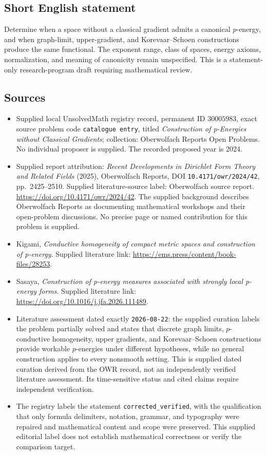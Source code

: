 \documentclass[11pt]{article}
\begin{document}
\subsection{Short English statement}
Determine when a space without a classical gradient admits a canonical \(p\)-energy, and when graph-limit, upper-gradient, and Korevaar--Schoen constructions produce the same functional. The exponent range, class of spaces, energy axioms, normalization, and meaning of canonicity remain unspecified. This is a statement-only research-program draft requiring mathematical review.
\subsection{Sources}
\begin{itemize}
\item Supplied local UnsolvedMath registry record, permanent ID \(30005983\), exact source problem code \texttt{catalogue entry}, titled \emph{Construction of p-Energies without Classical Gradients}; collection: Oberwolfach Reports Open Problems. No individual proposer is supplied. The recorded proposed year is 2024.
\item Supplied report attribution: \emph{Recent Developments in Dirichlet Form Theory and Related Fields} (2025), Oberwolfach Reports, DOI \texttt{10.4171/owr/2024/42}, pp.\ 2425--2510. Supplied literature-source label: Oberwolfach source report. \url{https://doi.org/10.4171/owr/2024/42}. The supplied background describes Oberwolfach Reports as documenting mathematical workshops and their open-problem discussions. No precise page or named contribution for this problem is supplied.
\item Kigami, \emph{Conductive homogeneity of compact metric spaces and construction of p-energy}. Supplied literature link: \url{https://ems.press/content/book-files/28253}.
\item Sasaya, \emph{Construction of p-energy measures associated with strongly local p-energy forms}. Supplied literature link: \url{https://doi.org/10.1016/j.jfa.2026.111489}.
\item Literature assessment dated exactly \texttt{2026-08-22}: the supplied curation labels the problem partially solved and states that discrete graph limits, \(p\)-conductive homogeneity, upper gradients, and Korevaar--Schoen constructions provide workable \(p\)-energies under different hypotheses, while no general construction applies to every nonsmooth setting. This is supplied dated curation derived from the OWR record, not an independently verified literature assessment. Its time-sensitive status and cited claims require independent verification.
\item The registry labels the statement \texttt{corrected\_verified}, with the qualification that only formula delimiters, notation, grammar, and typography were repaired and mathematical content and scope were preserved. This supplied editorial label does not establish mathematical correctness or verify the comparison target.
\end{itemize}
\end{document}
